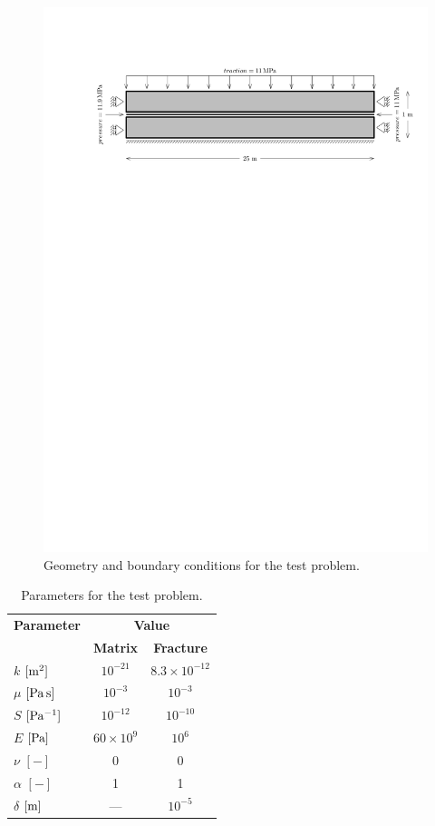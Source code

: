 \documentclass[a4paper]{article}
\numberwithin{equation}{section}
\begin{document}
\begin{figure}
\centering
\includegraphics[width=\textwidth]{figures/test-cubic-law-bc}
\caption{Geometry and boundary conditions for the test problem.}
\label{fig:test_geom}
\end{figure}

\begin{table}
\centering
\begin{tabular}{|l|c|c|}
\hline
\bf Parameter & \multicolumn{2}{|c|}{\bf Value}\\\cline{2-3}
& \bf Matrix & \bf Fracture\\
\hline
$k$ $[\rm m^2]$ & $10^{-21}$ & $8.3\times 10^{-12}$\\
$\mu$ $[\rm Pa\, s]$ & $10^{-3}$ & $10^{-3}$\\
$S$ $[\rm Pa^{-1}]$ & $10^{-12}$ & $10^{-10}$\\
$E$ $[\rm Pa]$ & $60\times 10^9$ & $10^{6}$ \\
$\nu$ $[-]$ & 0 & 0\\
$\alpha$ $[-]$ & 1 & 1\\
$\delta$ $[\rm m]$ & --- & $10^{-5}$\\
\hline
\end{tabular}
\caption{Parameters for the test problem.}
\label{tab:test_params}
\end{table}
\end{document}
